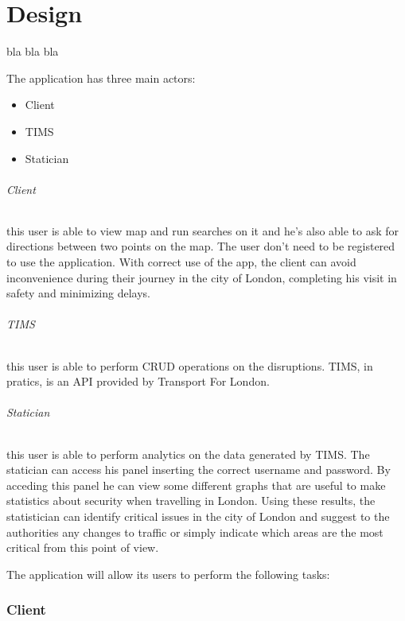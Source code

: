 
\part{Design}


bla bla bla


The application has three main actors:
\begin{itemize}
	\item Client
	\item TIMS
	\item Statician
\end{itemize}

\paragraph{Client}
this user is able to view map and run searches on it and he’s also able to ask 
for directions between two points on the map. The user don't need to be registered to use the application. With correct use of the app, the client can avoid inconvenience during their journey in the city of London, completing his visit in safety and minimizing delays.

\paragraph{TIMS}
this user is able to perform CRUD operations on the disruptions. TIMS, in pratics, is an API provided by Transport For London.

\paragraph{Statician}
this user is able to perform analytics on the data generated by TIMS. The statician can access his panel inserting the correct username and password. By acceding this panel he can view some different graphs that are useful to make statistics about security when travelling in London. Using these results, the statistician can identify critical issues in the city of London and suggest to the authorities any changes to traffic or simply indicate which areas are the most critical from this point of view.



The application will allow its users to perform the following tasks:

\section{Client}

